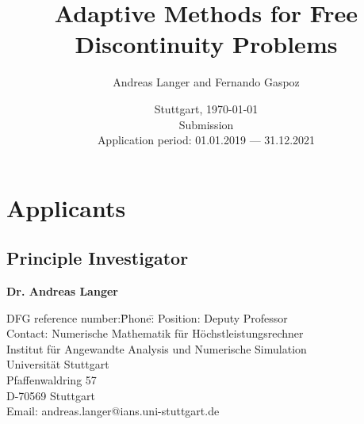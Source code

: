 \documentclass[enabledeprecatedfontcommands,cleardoublepage=empty,headsepline,twoside,11pt,DIV=15,BCOR=12mm,final]{scrartcl}
\begin{document}
\begin{titlepage}\sffamily
  \subject{DFG Research Grant Application} 
  \title{Adaptive Methods for Free Discontinuity Problems}%
  
  \author{Andreas Langer and Fernando Gaspoz}
  \date{Stuttgart, \today \\[50mm] Submission\\[50mm]
    Application period: 01.01.2019 --- 31.12.2021}
\end{titlepage}

\maketitle[-1]
\cleardoublepage
\setcounter{page}{1}
\pagestyle{scrheadings}


\section*{Applicants}

\subsection*{Principle Investigator}

\begin{flushleft}
  \textbf{Dr. Andreas Langer}
  \begin{tabbing}
    DFG reference number:\quad\=Phone:\quad\=\kill
    Position:\> Deputy Professor\\%
    Contact:\> Numerische Mathematik f\"ur H\"ochstleistungsrechner\\ 
    \>Institut f\"ur Angewandte Analysis und Numerische Simulation\\
    \> Universit\"at Stuttgart\\
    \> Pfaffenwaldring 57 \\
    \> D-70569 Stuttgart\\[1mm]
    \> Email:\> andreas.langer@ians.uni-stuttgart.de\\[1mm]
 \end{tabbing}
\end{flushleft}
\end{document}
